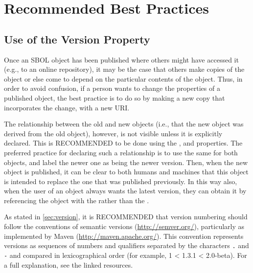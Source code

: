 \section{Recommended Best Practices}
\label{sec:bestpractices}
\subsection{Use of the Version Property}

Once an SBOL object has been published where others might have accessed it (e.g., to an online repository), it may be the case that others make copies of the object or else come to depend on the particular contents of the object.  Thus, in order to avoid confusion, if a person wants to change the properties of a published object, the best practice is to do so by making a new copy that incorporates the change, with a new URI.

The relationship between the old and new objects (i.e., that the new object was derived from the old object), however, is not visible unless it is explicitly declared.  This is RECOMMENDED to be done using the , and  properties. The preferred practice for declaring such a relationship is to use the same  for both objects, and label the newer one as being the newer version. Then, when the new object is published, it can be clear to both humans and machines that this object is intended to replace the one that was published previously.  In this way also, when the user of an object always wants the latest version, they can obtain it by referencing the object with the  rather than the .

As stated in \ref{sec:version},  it is RECOMMENDED that version numbering should follow the conventions of semantic versions (\url{http://semver.org/}), particularly as implemented by Maven (\url{http://maven.apache.org/}).  This convention represents versions as sequences of numbers and qualifiers separated by the characters {\tt .} and {\tt -} and compared in lexicographical order (for example, 1 < 1.3.1 < 2.0-beta).  For a full explanation, see the linked resources.


